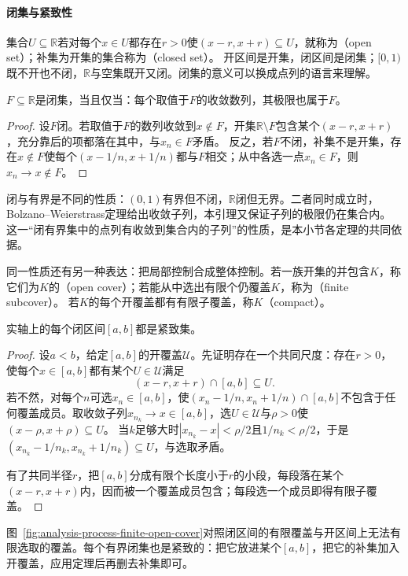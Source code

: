 \paragraph{闭集与紧致性}
集合$U\subseteq\mathbb R$若对每个$x\in U$都存在$r>0$使$(x-r,x+r)\subseteq U$，就称为（open set）；补集为开集的集合称为（closed set）。
开区间是开集，闭区间是闭集；$[0,1)$既不开也不闭，$\mathbb R$与空集既开又闭。闭集的意义可以换成点列的语言来理解。
\begin{lemma}[闭集的序列判据]
\label{lem:analysis-closed-sequence-criterion}
$F\subseteq\mathbb R$是闭集，当且仅当：每个取值于$F$的收敛数列，其极限也属于$F$。
\end{lemma}
\begin{proof}
设$F$闭。若取值于$F$的数列收敛到$x\notin F$，开集$\mathbb R\setminus F$包含某个$(x-r,x+r)$，充分靠后的项都落在其中，与$x_n\in F$矛盾。
反之，若$F$不闭，补集不是开集，存在$x\notin F$使每个$(x-1/n,x+1/n)$都与$F$相交；从中各选一点$x_n\in F$，则$x_n\to x\notin F$。
\end{proof}
闭与有界是不同的性质：$(0,1)$有界但不闭，$\mathbb R$闭但无界。二者同时成立时，Bolzano--Weierstrass定理给出收敛子列，本引理又保证子列的极限仍在集合内。
这一“闭有界集中的点列有收敛到集合内的子列”的性质，是本小节各定理的共同依据。

同一性质还有另一种表达：把局部控制合成整体控制。若一族开集的并包含$K$，称它们为$K$的（open cover）；若能从中选出有限个仍覆盖$K$，称为（finite subcover）。
若$K$的每个开覆盖都有有限子覆盖，称$K$（compact）。
\begin{theorem}[闭区间的有限子覆盖性质]
\label{thm:analysis-interval-finite-subcover}
实轴上的每个闭区间$[a,b]$都是紧致集。
\end{theorem}
\begin{proof}
设$a<b$，给定$[a,b]$的开覆盖$\mathcal U$。先证明存在一个共同尺度：存在$r>0$，使每个$x\in[a,b]$都有某个$U\in\mathcal U$满足
\[
 (x-r,x+r)\cap[a,b]\subseteq U.
\]
若不然，对每个$n$可选$x_n\in[a,b]$，使$(x_n-1/n,x_n+1/n)\cap[a,b]$不包含于任何覆盖成员。取收敛子列$x_{n_k}\to x\in[a,b]$，选$U\in\mathcal U$与$\rho>0$使$(x-\rho,x+\rho)\subseteq U$。
当$k$足够大时$|x_{n_k}-x|<\rho/2$且$1/n_k<\rho/2$，于是$(x_{n_k}-1/n_k,x_{n_k}+1/n_k)\subseteq U$，与选取矛盾。

有了共同半径$r$，把$[a,b]$分成有限个长度小于$r$的小段，每段落在某个$(x-r,x+r)$内，因而被一个覆盖成员包含；每段选一个成员即得有限子覆盖。
\end{proof}
图~\ref{fig:analysis-process-finite-open-cover}对照闭区间的有限覆盖与开区间上无法有限选取的覆盖。每个有界闭集也是紧致的：把它放进某个$[a,b]$，把它的补集加入开覆盖，应用定理后再删去补集即可。

